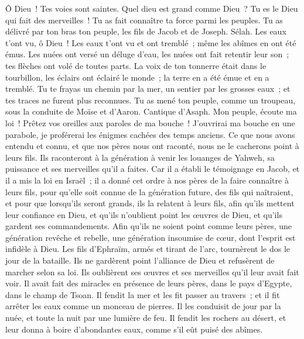 \begin{multicols}{2}
Ô Dieu~! Tes voies sont saintes. Quel dieu est grand comme Dieu~?
Tu es le Dieu qui fait des merveilles~! Tu as fait connaître ta force parmi les peuples.
Tu as délivré par ton bras ton peuple, les fils de Jacob et de Joseph. Sélah.
Les eaux t'ont vu, ô Dieu~! Les eaux t'ont vu et ont tremblé~; même les abîmes en ont été émus.
Les nuées ont versé un déluge d'eau, les nuées ont fait retentir leur son~; tes flèches ont volé de toutes parts.
La voix de ton tonnerre était dans le tourbillon, les éclairs ont éclairé le monde~; la terre en a été émue et en a tremblé.
Tu te frayas un chemin par la mer, un sentier par les grosses eaux~; et tes traces ne furent plus reconnues.
Tu as mené ton peuple, comme un troupeau, sous la conduite de Moïse et d'Aaron.
\VerseOne{}Cantique d'Asaph. Mon peuple, écoute ma loi~! Prêtez vos oreilles aux paroles de ma bouche~!
J'ouvrirai ma bouche en une parabole, je proférerai les énigmes cachées des temps anciens.
Ce que nous avons entendu et connu, et que nos pères nous ont raconté,
nous ne le cacherons point à leurs fils. Ils raconteront à la génération à venir les louanges de Yahweh, sa puissance et ses merveilles qu'il a faites.
Car il a établi le témoignage en Jacob, et il a mis la loi en Israël~; il a donné cet ordre à nos pères de la faire connaître à leurs fils,
pour qu'elle soit connue de la génération future, des fils qui naîtraient, et pour que lorsqu'ils seront grands, ils la relatent à leurs fils,
afin qu'ils mettent leur confiance en Dieu, et qu'ils n'oublient point les œuvres de Dieu, et qu'ils gardent ses commandements.
Afin qu'ils ne soient point comme leurs pères, une génération revêche et rebelle, une génération insoumise de cœur, dont l'esprit est infidèle à Dieu.
Les fils d'Ephraïm, armés et tirant de l'arc, tournèrent le dos le jour de la bataille.
Ils ne gardèrent point l'alliance de Dieu et refusèrent de marcher selon sa loi.
Ils oublièrent ses œuvres et ses merveilles qu'il leur avait fait voir.
Il avait fait des miracles en présence de leurs pères, dans le pays d'Egypte, dans le champ de Tsoan.
Il fendit la mer et les fit passer au travers~; et il fit arrêter les eaux comme un monceau de pierres.
Il les conduisit de jour par la nuée, et toute la nuit par une lumière de feu.
Il fendit les rochers au désert, et leur donna à boire d'abondantes eaux, comme s'il eût puisé des abîmes.

\end{multicols}
